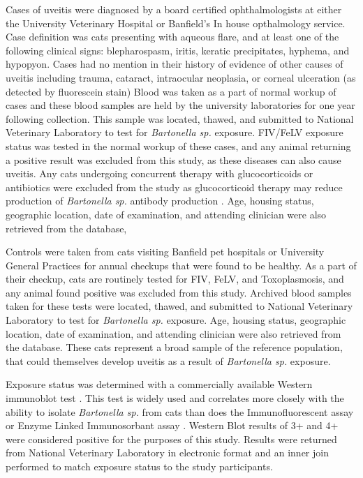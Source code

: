 \documentclass[11pt,twocolumn]{article}
\begin{document}
	Cases of uveitis were diagnosed by a board certified ophthalmologists at either the University Veterinary Hospital or Banfield's In house opthalmology service.
	Case definition was cats presenting with aqueous flare, and at least one of the following clinical signs: blepharospasm, iritis, keratic precipitates, hyphema, and hypopyon. 
	Cases had no mention in their history of evidence of other causes of uveitis including trauma, cataract, intraocular neoplasia, or corneal ulceration (as detected by fluorescein stain) 
	Blood was taken as a part of normal workup of cases and these blood samples are held by the university laboratories for one year following collection. This sample was located, thawed, and submitted to National Veterinary Laboratory to test for \emph{Bartonella sp.} exposure.
	FIV/FeLV exposure status was tested in the normal workup of these cases, and any animal returning a positive result was excluded from this study, as these diseases can also cause uveitis. 
	Any cats undergoing concurrent therapy with glucocorticoids or antibiotics were excluded from the study as glucocorticoid therapy may reduce production of \emph{Bartonella sp.} antibody production \cite{Lappin2000}.
	Age, housing status, geographic location, date of examination, and attending clinician  were also retrieved from the database, 



	Controls were taken from cats visiting Banfield pet hospitals or University General Practices for annual checkups that were found to be healthy. 
	As a part of their checkup, cats are routinely tested for FIV, FeLV, and Toxoplasmosis, and any animal found positive was excluded from this study. 
	Archived blood samples taken for these tests were located, thawed, and submitted to National Veterinary Laboratory to test for \emph{Bartonella sp.} exposure.
	Age, housing status, geographic location, date of examination, and attending clinician  were also retrieved from the database. 
	These cats represent a broad sample of the reference population, that could themselves develop uveitis as a result of \emph{Bartonella sp.} exposure.


	Exposure status was determined with a commercially available Western immunoblot test \cite{febart}. This test is widely used and correlates more closely with the ability to isolate \emph{Bartonella sp.} from cats than does the Immunofluorescent assay or Enzyme Linked Immunosorbant assay \cite{Jr1995}. 
	Western Blot results of 3+ and 4+ were considered positive for the purposes of this study. 
	Results were returned from National Veterinary Laboratory in electronic format and an inner join performed to match exposure status to the study participants.
\end{document}
